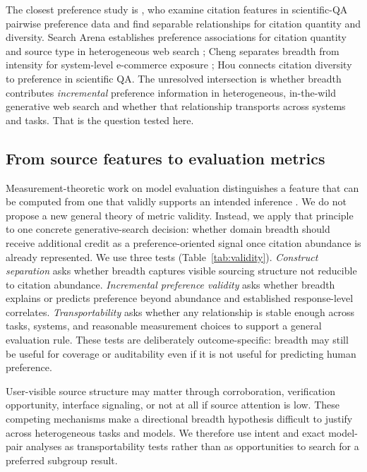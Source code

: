 \documentclass[sigconf,natbib=true,anonymous=true]{acmart}
\begin{document}
The closest preference study is \citet{hou2026citations}, who examine citation features in scientific-QA pairwise preference data and find separable relationships for citation quantity and diversity. Search Arena establishes preference associations for citation quantity and source type in heterogeneous web search \citep{miroyan2026searcharena}; Cheng separates breadth from intensity for system-level e-commerce exposure \citep{cheng2026citationgovernance}; Hou connects citation diversity to preference in scientific QA. The unresolved intersection is whether breadth contributes \emph{incremental} preference information in heterogeneous, in-the-wild generative web search and whether that relationship transports across systems and tasks. That is the question tested here.

\subsection{From source features to evaluation metrics}
Measurement-theoretic work on model evaluation distinguishes a feature that can be computed from one that validly supports an intended inference \citep{xiao2023metricleval}. We do not propose a new general theory of metric validity. Instead, we apply that principle to one concrete generative-search decision: whether domain breadth should receive additional credit as a preference-oriented signal once citation abundance is already represented. We use three tests (Table~\ref{tab:validity}). \emph{Construct separation} asks whether breadth captures visible sourcing structure not reducible to citation abundance. \emph{Incremental preference validity} asks whether breadth explains or predicts preference beyond abundance and established response-level correlates. \emph{Transportability} asks whether any relationship is stable enough across tasks, systems, and reasonable measurement choices to support a general evaluation rule. These tests are deliberately outcome-specific: breadth may still be useful for coverage or auditability even if it is not useful for predicting human preference.

User-visible source structure may matter through corroboration, verification opportunity, interface signaling, or not at all if source attention is low. These competing mechanisms make a directional breadth hypothesis difficult to justify across heterogeneous tasks and models. We therefore use intent and exact model-pair analyses as transportability tests rather than as opportunities to search for a preferred subgroup result.
\end{document}
